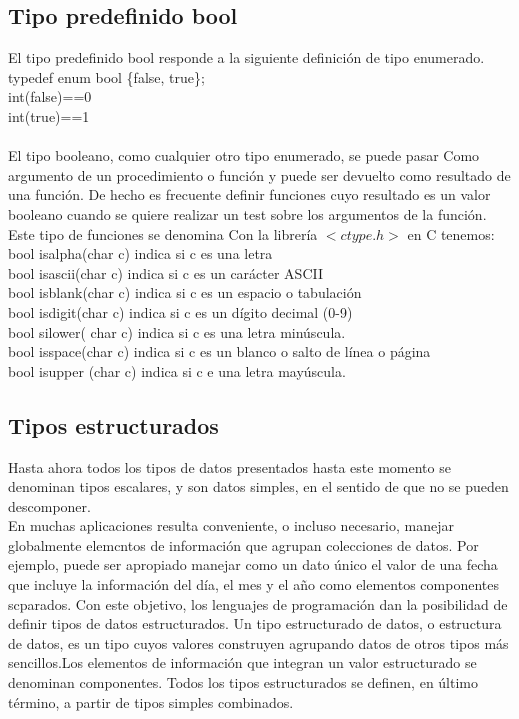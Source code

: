 \documentclass[11pt,a4paper]{article}
\begin{document}
  \subsection{Tipo predefinido bool}
  El tipo predefinido bool responde a la siguiente definición de tipo enumerado.\\
  typedef enum bool \{false, true\};\\
  int(false)==0\\
  int(true)==1\\
  \\
  El tipo booleano, como cualquier otro tipo enumerado, se puede pasar Como
  argumento de un procedimiento o función y puede ser devuelto como resultado
  de una función. De hecho es frecuente definir funciones cuyo resultado es un
  valor booleano cuando se quiere realizar un test sobre los argumentos de la
  función. Este tipo de funciones se denomina
  Con la librería $<ctype.h>$ en C tenemos:\\
  bool isalpha(char c) indica si c es una letra\\
  bool isascii(char c) indica si c es un carácter ASCII\\
  bool isblank(char c) indica si c es un espacio o tabulación\\
  bool isdigit(char c) indica si c es un dígito decimal (0-9)\\
  bool silower( char c) indica si c es una letra minúscula.\\
  bool isspace(char c) indica si c es un blanco o salto de línea o página\\
  bool isupper (char c) indica si c e una letra mayúscula.
  \subsection{Tipos estructurados}
  Hasta ahora todos los tipos de datos presentados hasta este momento se denominan tipos escalares, y son datos simples, en el sentido de que no se pueden descomponer.\\
  En muchas aplicaciones resulta conveniente, o incluso necesario, manejar globalmente
  elemcntos de información que agrupan colecciones de datos. Por
  ejemplo, puede ser apropiado manejar como un dato único el valor de una
  fecha que incluye la información del día, el mes y el año como elementos componentes
  scparados. Con este objetivo, los lenguajes de programación dan la
  posibilidad de definir tipos de datos estructurados.
  Un tipo estructurado de datos, o estructura de datos, es un tipo cuyos valores
  construyen agrupando datos de otros tipos más sencillos.Los elementos de
  información que integran un valor estructurado se denominan componentes.
  Todos los tipos estructurados se definen, en último término, a partir de tipos simples combinados.
\end{document}
